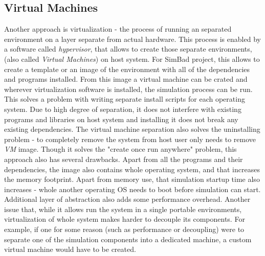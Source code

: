 \subsection{Virtual Machines}
Another approach is virtualization - the process of running an separated environment on a layer separate from actual hardware. This process is enabled by a software called \textit{hypervisor}, that allows to create those separate environments, (also called \textit{Virtual Machines}) on host system. For SimBad project, this allows to create a template or an image of the environment with all of the dependencies and programs installed. From this image a virtual machine can be crated and wherever virtualization software is installed, the simulation process can be run. This solves a problem with writing separate install scripts for each operating system. Due to high degree of separation, it does not interfere with existing programs and libraries on host system and installing it does not break any existing dependencies. The virtual machine separation also solves the uninstalling problem - to completely remove the system from host user only needs to remove \textit{VM} image. 
Though it solves the "create once run anywhere" problem, this approach also has several drawbacks. Apart from all the programs and their dependencies, the image also contains whole operating system, and that increases the memory footprint. Apart from memory use, that simulation startup time also increases - whole another operating OS needs to boot before simulation can start. Additional layer of abstraction also adds some performance overhead. Another issue that, while it allows run the system in a single portable environments, virtualization of whole system makes harder to decouple its components. For example, if one for some reason (such as performance or decoupling) were to separate one of the simulation components into a dedicated machine, a custom virtual machine would have to be created. 
